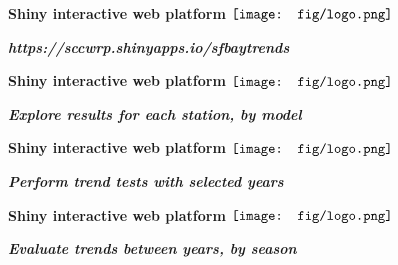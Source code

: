 \documentclass{beamer}
\newcommand{\emtxt}[1]{\textbf{\textit{{\color{mypal4} #1}}}}
\begin{document}
\begin{frame}{\textbf{Shiny interactive web platform} \hspace{0pt plus 1 filll} $\vcenter{\hbox{\texttt{[image: fig/logo.png]}}}$}
\vspace{-0.15in}
\begin{center}
\emtxt{https://sccwrp.shinyapps.io/sfbaytrends}
\end{center}
\centerline{}
\end{frame}

\begin{frame}{\textbf{Shiny interactive web platform} \hspace{0pt plus 1 filll} $\vcenter{\hbox{\texttt{[image: fig/logo.png]}}}$}
\vspace{-0.15in}
\begin{center}
\emtxt{Explore results for each station, by model}
\end{center}
\centerline{}
\end{frame}

\begin{frame}{\textbf{Shiny interactive web platform} \hspace{0pt plus 1 filll} $\vcenter{\hbox{\texttt{[image: fig/logo.png]}}}$}
\vspace{-0.25in}
\begin{center}
\emtxt{Perform trend tests with selected years}
\end{center}
\begin{overprint}
\centerline{}
\centerline{}
\end{overprint}
\end{frame}

\begin{frame}{\textbf{Shiny interactive web platform} \hspace{0pt plus 1 filll} $\vcenter{\hbox{\texttt{[image: fig/logo.png]}}}$}
\vspace{-0.15in}
\begin{center}
\emtxt{Evaluate trends between years, by season}
\end{center}
\begin{overprint}
\centerline{}
\centerline{}
\end{overprint}
\end{frame}
\end{document}
